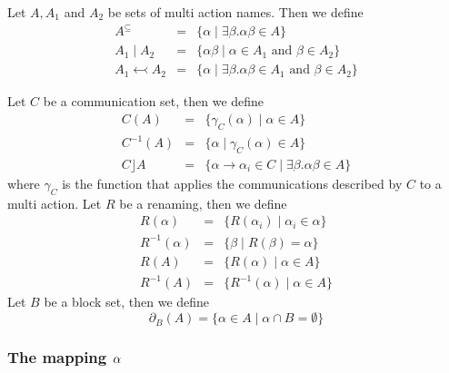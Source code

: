 \documentclass{article}
\begin{document}
Let $A,A_{1}$ and $A_{2}$ be sets of multi action names. Then we define%
\[
\begin{array}{lll}
A^{\subseteq } & = & \{\alpha \mid \exists \beta .\alpha \beta \in A\} \\ 
A_{1}\mid A_{2} & = & \{\alpha \beta \mid \alpha \in A_{1}\text{ and }\beta
\in A_{2}\} \\ 
A_{1}\leftarrowtail A_{2} & = & \{\alpha \mid \exists \beta .\alpha \beta
\in A_{1}\text{ and }\beta \in A_{2}\}%
\end{array}%
\]

Let $C$ be a communication set, then we define%
\[
\begin{array}{lll}
C(A) & = & \{\gamma _{C}(\alpha )\mid \alpha \in A\} \\ 
C^{-1}(A) & = & \{\alpha \mid \gamma _{C}(\alpha )\in A\} \\ 
C\rfloor A & = & \{\alpha \rightarrow \alpha _{i}\in C\mid \exists \beta
.\alpha \beta \in A\}%
\end{array}%
\]%
where $\gamma _{C}$ is the function that applies the communications
described by $C$ to a multi action. Let $R$ be a renaming, then we define%
\begin{eqnarray*}
R(\alpha ) &=&\{R(\alpha _{i})\mid \alpha _{i}\in \alpha \} \\
R^{-1}(\alpha ) &=&\{\beta \mid R(\beta )=\alpha \} \\
R(A) &=&\{R(\alpha )\mid \alpha \in A\} \\
R^{-1}(A) &=&\{R^{-1}(\alpha )\mid \alpha \in A\}
\end{eqnarray*}%
Let $B$ be a block set, then we define%
\[
\partial _{B}(A)=\{\alpha \in A\mid \alpha \cap B=\emptyset \} 
\]%
\newpage

\subsubsection{The mapping $\protect\alpha $}
\end{document}
